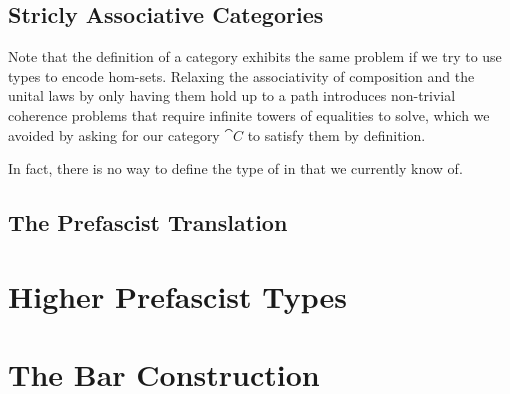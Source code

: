 \subsection{Stricly Associative Categories}\label{sec:cat-strictification}

Note that the definition of a category exhibits the same problem if we try to
use types to encode hom-sets. 
% 
Relaxing the associativity of composition and the unital laws by only having
them hold up to a path introduces non-trivial coherence problems that require 
infinite towers of equalities to solve, which we avoided by asking for our
category \( \cat{C} \) to satisfy them by definition.

In fact, there is no way to define the type of  in \HoTT that we currently know of. 

\subsection{The Prefascist Translation}

\section{Higher Prefascist Types}

\section{The Bar Construction}